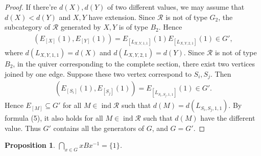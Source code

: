 \documentclass[12pt]{amsart}
\newtheorem{proposition}[theorem]{Proposition}
\begin{document}
\begin{proof}
   If there're $d(X),d(Y)$ of two different values, we may assume that $d(X)<d(Y)$ and $X,Y$ have extension.
   Since $\mathcal{R}$ is not of type $G_2$, the subcategory of $\mathcal{R}$ generated by $X,Y$ is of type $B_2$. Hence
   \begin{align}
    (E_{[X]}(1),E_{[Y]}(1)) = E_{[L_{X,Y,1,1}]}(1) E_{[L_{X,Y,2,1}]}(1) \in G',
   \end{align}
   where $d(L_{X,Y,1,1})=d(X)$ and $d(L_{X,Y,2,1})=d(Y)$.
   Since $\mathcal{R}$ is not of type $B_2$, in the quiver corresponding to the complete section, there exist two vertices joined by one edge.
   Suppose these two vertex correspond to $S_i,S_j$. Then
   \begin{align*}
    (E_{[S_i]}(1),E_{[S_j]}(1)) = E_{[L_{S_i,S_j,1,1}]}(1) \in G'.
   \end{align*}
   Hence $E_{[M]}\subseteq  G'$ for all $M\in \operatorname{ind}\mathcal{R}$ such that $d(M) = d(L_{S_i,S_j,1,1})$.
   By formula (5), it also holds for all $M\in \operatorname{ind}\mathcal{R}$ such that $d(M)$ have the different value.
   Thus $G'$ contains all the generators of $G$, and $G=G'$.
\end{proof}

\begin{proposition}\label{xGx-1}
    $\bigcap\limits_{x\in G} xBx^{-1} = \{1\}$.
\end{proposition}
\end{document}
